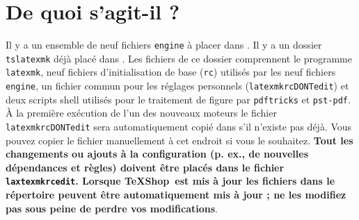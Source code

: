 \documentclass[11pt,french]{article}
\newcommand{\TS}{\textsf{\TeX Shop}}
\begin{document}
\section{De quoi s'agit-il ?}

Il y a un ensemble de neuf fichiers \texttt{engine} à placer dans . Il y a un dossier \texttt{tslatexmk} déjà placé dans . Les fichiers de ce dossier comprennent le programme \texttt{latexmk}, neuf fichiers d'initialisation de base (\texttt{rc}) utilisés par les neuf fichiers \texttt{engine}, un fichier commun pour les réglages personnels (\texttt{latexmkrcDONTedit}) et deux scripts shell utilisés pour le traitement de figure par \texttt{pdftricks} et \texttt{pst-pdf}. À la première exécution de l'un des nouveaux moteurs le fichier \texttt{latexmkrcDONTedit} sera automatiquement copié dans  s'il  n'existe pas déjà. Vous pouvez copier le fichier manuellement à cet endroit si vous le souhaitez. \textbf{Tout les changements ou ajouts à la configuration (p. ex., de nouvelles dépendances et règles) doivent être placés dans le fichier \texttt{laxtexmkrcedit}. Lorsque \TS\ est mis à jour les fichiers dans le répertoire  peuvent être automatiquement mis à jour ; ne les modifiez pas sous peine de perdre vos modifications}.
\end{document}
